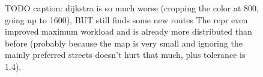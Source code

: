         \begin{figure}[htb]
            \centering%
            \hfill%
            \caption[Workloads when balancing after first update]{%
                TODO caption: \gls{dijkstra} is so much worse (cropping the color at 800, going up to 1600), BUT still finds some new routes
                The \gls{repr} even improved maximum workload and is already more distributed than before (probably because the map is very small and ignoring the mainly preferred streets doesn't hurt that much, plus tolerance is 1.4).
                \label{fig:both/1/workloads}
            }
        \end{figure}


